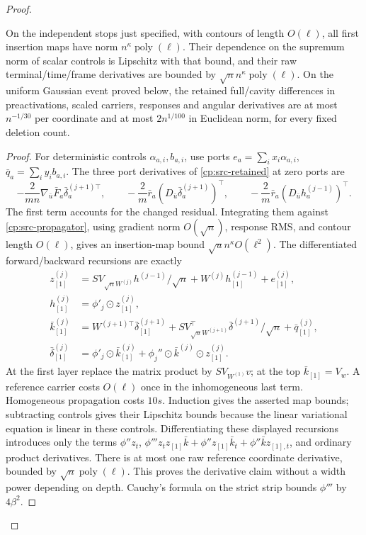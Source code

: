\begin{proof}
\begin{claim}
\label{cp:src-local-lemma}
On the independent stops just specified, with contours of length
\(O(\ell)\), all first insertion maps have norm
\(n^\kappa\operatorname{poly}(\ell)\).  Their dependence on the
supremum norm of scalar controls is Lipschitz with that bound, and
their raw terminal/time/frame derivatives are bounded by
\(\sqrt n n^\kappa\operatorname{poly}(\ell)\).
On the uniform Gaussian event proved below, the retained full/cavity
differences in preactivations, scaled carriers, responses and angular
derivatives are at most \(n^{-1/30}\) per coordinate and at most
\(2n^{1/100}\) in Euclidean norm, for every fixed deletion count.
\end{claim}
\begin{proof}
For deterministic controls \(\alpha_{a,i},b_{a,i}\), use ports
\(e_a=\sum_ix_i\alpha_{a,i}\), \(\bar q_a=\sum_iy_ib_{a,i}\).
The three port derivatives of \eqref{cp:src-retained} at zero ports are
\[
 -\frac2{mn}\nabla_{\bar u}\bar F_a\bar\delta_a^{(j+1)\top},
 \qquad -\frac2m\bar r_a(D_{\bar u}\bar\delta_a^{(j+1)})^\top,
 \qquad -\frac2m\bar r_a(D_{\bar u}h_a^{(j-1)})^\top.
\]
The first term accounts for the changed residual.  Integrating them
against \eqref{cp:src-propagator}, using gradient norm
\(O(\sqrt n)\), response RMS, and contour length \(O(\ell)\),
gives an insertion-map bound \(\sqrt u n^\kappa O(\ell^2)\).
The differentiated forward/backward recursions are exactly
\begin{align*}
 z_{[1]}^{(j)}&=SV_{\sqrt nW^{(j)}}h^{(j-1)}/\sqrt n
                      +W^{(j)}h_{[1]}^{(j-1)}+e_{[1]}^{(j)},\\
 h_{[1]}^{(j)}&=\phi'_j\odot z_{[1]}^{(j)},\\
 \bar k_{[1]}^{(j)}&=W^{(j+1)\top}\bar\delta_{[1]}^{(j+1)}
       +SV_{\sqrt nW^{(j+1)}}^\top\bar\delta^{(j+1)}/\sqrt n
       +\bar q_{[1]}^{(j)},\\
 \bar\delta_{[1]}^{(j)}&=\phi'_j\odot\bar k_{[1]}^{(j)}
       +\phi_j''\odot\bar k^{(j)}\odot z_{[1]}^{(j)}.
\end{align*}
At the first layer replace the matrix product by \(SV_{W^{(1)}}v\);
at the top \(\bar k_{[1]}=V_w\).  A reference carrier costs
\(O(\ell)\) once in the inhomogeneous last term.  Homogeneous
propagation costs \(10s\).  Induction gives the asserted map bounds;
subtracting controls gives their Lipschitz bounds because the linear
variational equation is linear in these controls.  Differentiating
these displayed recursions introduces only the terms
\(\phi''z_t\),
\(\phi'''z_tz_{[1]}\bar k+\phi''z_{[1]}\bar k_t
+\phi''\bar k z_{[1],t}\), and ordinary product derivatives.
There is at most one raw reference coordinate derivative, bounded by
\(\sqrt n\operatorname{poly}(\ell)\).  This proves the derivative
claim without a width power depending on depth.  Cauchy's formula on
the strict strip bounds \(\phi'''\) by \(4\beta^2\).


\end{proof}
\end{proof}
